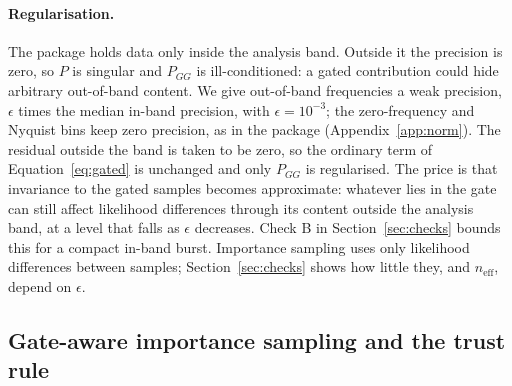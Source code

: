 \documentclass{openjournal}
\newcommand{\neff}{n_{\mathrm{eff}}}
\begin{document}
\paragraph{Regularisation.}
The package holds data only inside the analysis band.
Outside it the precision is zero, so $P$ is singular and $P_{GG}$ is ill-conditioned: a gated contribution could hide arbitrary out-of-band content.
We give out-of-band frequencies a weak precision, $\epsilon$ times the median in-band precision, with $\epsilon=10^{-3}$; the zero-frequency and Nyquist bins keep zero precision, as in the package (Appendix~\ref{app:norm}).
The residual outside the band is taken to be zero, so the ordinary term of Equation~\eqref{eq:gated} is unchanged and only $P_{GG}$ is regularised.
The price is that invariance to the gated samples becomes approximate: whatever lies in the gate can still affect likelihood differences through its content outside the analysis band, at a level that falls as $\epsilon$ decreases.
Check B in Section~\ref{sec:checks} bounds this for a compact in-band burst.
Importance sampling uses only likelihood differences between samples; Section~\ref{sec:checks} shows how little they, and $\neff$, depend on $\epsilon$.

\subsection{Gate-aware importance sampling and the trust rule}
\label{sec:is}
\end{document}
